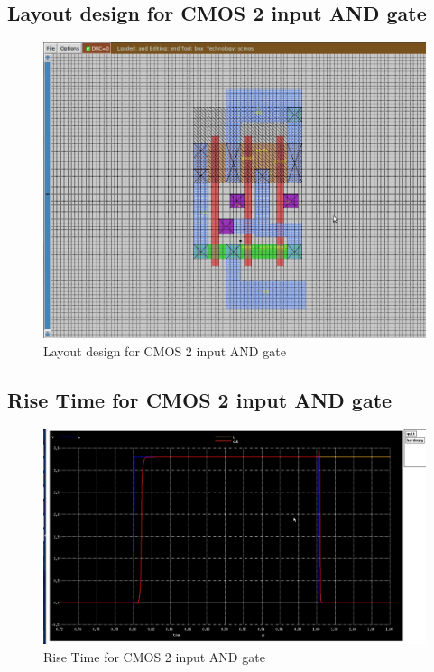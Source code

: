\documentclass[12pt,a4paper]{article}
\begin{document}
\begin{center}
\clearpage
\subsection{Layout design for CMOS 2 input AND gate}
\vspace{15pt}
\begin{figure}[h]
\centering
\includegraphics[scale=.4]{twoandlay.jpg}
\caption[Short]{Layout design for CMOS 2 input AND gate}
\end{figure}

\subsection{Rise Time for CMOS 2 input AND gate}
\vspace{15pt}

\begin{figure}[h]
\centering
\includegraphics[scale=.4]{and_risefall_time1.jpg}
\caption[Short]{Rise Time for CMOS 2 input AND gate}
\end{figure}


\end{center}
\end{document}
